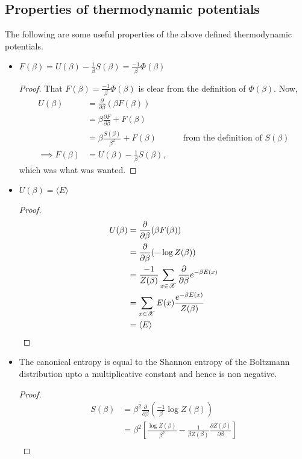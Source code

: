 \documentclass[letterpaper,english,12pt]{article}
\begin{document}
\subsection{Properties of thermodynamic potentials}
The following are some useful properties of the above defined thermodynamic potentials.
\begin{lem}
\begin{itemize}
\item $F(\beta) = U(\beta) - \frac{1}{\beta} S(\beta) = \frac{-1}{\beta} \Phi(\beta)$
\begin{proof}
That $F(\beta) = \frac{-1}{\beta} \Phi(\beta)$ is clear from the definition of $\Phi(\beta)$. Now,
\begin{align*}
U(\beta) &= \frac{\partial}{\partial \beta} (\beta F(\beta)) \\
	&= \beta \frac{\partial F}{\partial \beta} + F(\beta) \\
	&= \beta \frac{S(\beta)}{\beta^2} + F(\beta) && \text{ from the definition of $S(\beta)$} \\
\implies F(\beta) &= U(\beta) - \frac{1}{\beta} S(\beta),
\end{align*}
which was what was wanted.
\end{proof}
\item $U(\beta) = \langle E \rangle$
\begin{proof}
\begin{align*}
U(\beta) &= \frac{\partial}{\partial \beta} (\beta F(\beta)) \\
	&= \frac{\partial}{\partial \beta} ( -\log Z(\beta)) \\
	&= \frac{-1}{Z(\beta)} \sum_{x \in \mathscr{X}} \frac{\partial}{\partial \beta} e^{-\beta E(x)} \\
	&= \sum_{x \in \mathscr{X}} E(x) \frac{e^{-\beta E(x)}}{Z(\beta)} \\
	&= \langle E \rangle
\end{align*}
\end{proof}
\item The canonical entropy is equal to the Shannon entropy of the Boltzmann distribution upto a multiplicative constant and hence is non negative.
\begin{proof}
\begin{align*}
S(\beta) &= \beta^2 \frac{\partial}{\partial \beta} \left( \frac{-1}{\beta} \log Z(\beta) \right) \\
	&= \beta^2 \left[ \frac{\log Z(\beta)}{\beta^2} - \frac{1}{\beta Z(\beta)} \frac{\partial Z(\beta)}{\partial \beta} \right] \\

\end{align*}
\end{proof}
\end{itemize}
\end{lem}
\end{document}
